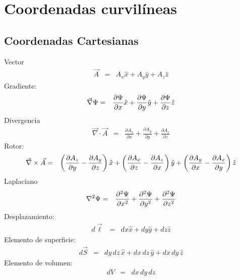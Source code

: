 \chapter{Coordenadas curvilíneas}

\section{Coordenadas Cartesianas}
\noindent Vector
\begin{eqnarray}
\vec{A} 
&=& A_x{\hat x} + A_y {\hat y} + A_z {\hat z} 
\end{eqnarray}
Gradiente:
\begin{eqnarray}
\vec\nabla\Psi&=&{\partial\Psi\over\partial x} {\hat x} + {\partial\Psi\over
\partial y} {\hat y} + {\partial\Psi\over\partial z} {\hat z}
\end{eqnarray} 
Divergencia
\begin{eqnarray}
\vec\nabla\cdot\vec{A}
&=&\frac{\partial A_x}{\partial x}+\frac{\partial A_y}{\partial y}+\frac{\partial A_z}{\partial z}
\end{eqnarray} 
Rotor:
\begin{eqnarray}
\vec\nabla\times\vec{A}
&=&\left({\partial A_z\over\partial y} - {\partial A_y\over
\partial z}\right) {\hat x} + 
\left({\partial A_x\over\partial z} - {\partial A_z\over
\partial x}\right) {\hat y} + 
\left({\partial A_y\over\partial x} - {\partial A_x\over
\partial y}\right) {\hat z} 
\end{eqnarray}
Laplaciano
\begin{eqnarray}
\nabla^2\Psi
&=& {\partial^2\Psi\over\partial x^2} + {\partial^2\Psi\over\partial y^2} +
{\partial^2\Psi\over\partial z^2}
\end{eqnarray} 
Desplazamiento:
\begin{eqnarray}
 d\vec{\ell} &=& dx {\hat x} + dy {\hat y} + dz {\hat z} 
\end{eqnarray} 
Elemento de superficie:
\begin{eqnarray}
 d\vec{S} &=& dy\,dz\, {\hat x} + dx\,dz\, {\hat y} +
dx\,dy\, {\hat z}
\end{eqnarray}
Elemento de volumen:
\begin{eqnarray}
 dV &=& dx\,dy\,dz 
\end{eqnarray} 

